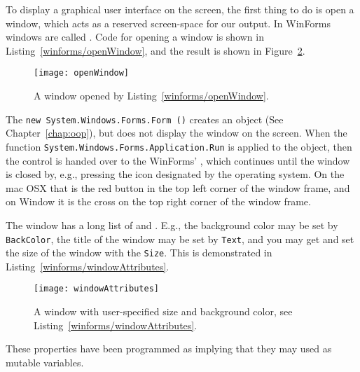 To display a graphical user interface on the screen, the first thing to do is open a window, which acts as a reserved screen-space for our output. In WinForms windows are called . Code for opening a window is shown in Listing~\ref{winforms/openWindow}, and the result is shown in Figure~\ref{fig:openWindow}.
%
%
\begin{figure}
  \centering
  \texttt{[image: openWindow]}
  \caption{A window opened by Listing~\ref{winforms/openWindow}.}
  \label{fig:openWindow}
\end{figure}
The \lstinline!new System.Windows.Forms.Form ()! creates an object (See Chapter~\ref{chap:oop}), but does not display the window on the screen. When the function \lstinline!System.Windows.Forms.Application.Run! is applied to the object, then the control is handed over to the WinForms' , which continues until the window is closed by, e.g., pressing the icon designated by the operating system. On the mac OSX that is the red button in the top left corner of the window frame, and on Window it is the cross on the top right corner of the window frame.

The window has a long list of  and . E.g., the background color may be set by \lstinline!BackColor!, the title of the window may be set by \lstinline!Text!, and you may get and set the size of the window with the \lstinline!Size!. This is demonstrated in Listing~\ref{winforms/windowAttributes}.
%
%
\begin{figure}
  \centering
  \texttt{[image: windowAttributes]}
  \caption{A window with user-specified size and background color, see Listing~\ref{winforms/windowAttributes}.}
  \label{fig:openWindow}
\end{figure}
These properties have been programmed as  implying that they may used as mutable variables. 


